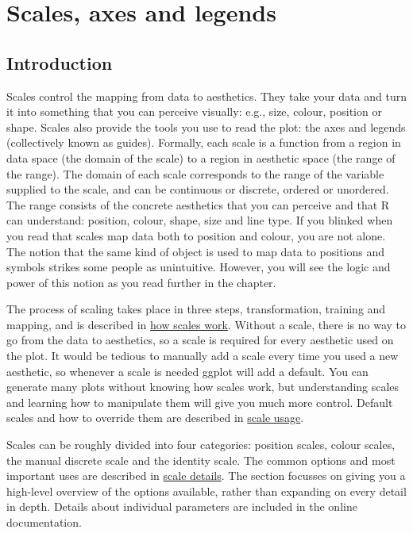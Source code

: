 \chapter{Scales, axes and legends}\label{cha:scales}

\section{Introduction}

Scales control the mapping from data to aesthetics. They take your data
and turn it into something that you can perceive visually: e.g., size,
colour, position or shape. Scales also provide the tools you use to read
the plot: the axes and legends (collectively known as guides). Formally,
each scale is a function from a region in data space (the domain of the
scale) to a region in aesthetic space (the range of the range). The
domain of each scale corresponds to the range of the variable supplied
to the scale, and can be continuous or discrete, ordered or unordered.
The range consists of the concrete aesthetics that you can perceive and
that R can understand: position, colour, shape, size and line type. If
you blinked when you read that scales map data both to position and
colour, you are not alone. The notion that the same kind of object is
used to map data to positions and symbols strikes some people as
unintuitive. However, you will see the logic and power of this notion as
you read further in the chapter.

The process of scaling takes place in three steps, transformation,
training and mapping, and is described in
\hyperref[sec:how-scales-work]{how scales work}. Without a scale, there
is no way to go from the data to aesthetics, so a scale is required for
every aesthetic used on the plot. It would be tedious to manually add a
scale every time you used a new aesthetic, so whenever a scale is needed
ggplot will add a default. You can generate many plots without knowing
how scales work, but understanding scales and learning how to manipulate
them will give you much more control. Default scales and how to override
them are described in \hyperref[sec:scale-usage]{scale usage}.

Scales can be roughly divided into four categories: position scales,
colour scales, the manual discrete scale and the identity scale. The
common options and most important uses are described in
\hyperref[sec:scale-details]{scale details}. The section focusses on
giving you a high-level overview of the options available, rather than
expanding on every detail in depth. Details about individual parameters
are included in the online documentation.

